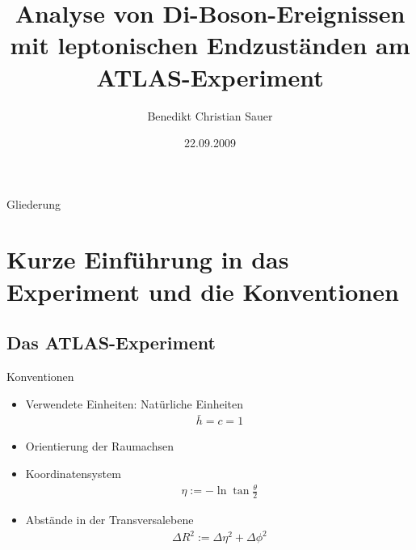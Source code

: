 \documentclass{beamer}
\title[Analyse von Di-Boson-Ereignissen]{Analyse von Di-Boson-Ereignissen mit
leptonischen Endzuständen am ATLAS-Experiment
}
\author[B. Sauer]{Benedikt Christian Sauer}
\institute{Bachelorarbeit am Physikalischen Institut der Universität Bonn}
\date{22.09.2009}
\begin{document}
\begin{frame}
  \titlepage
\end{frame}

\begin{frame}{Gliederung}
  \tableofcontents[pausesections]
\end{frame}

\section{Kurze Einführung in das Experiment und die Konventionen}
\subsection{Das ATLAS-Experiment}

\begin{frame}{Konventionen}
  \begin{itemize}
    \item Verwendete Einheiten: Natürliche Einheiten
      \begin{align}
        \bar h = c = 1
      \end{align}
    \item Orientierung der Raumachsen
      \pause
    \item Koordinatensystem
      \pause
      \begin{align}
        \eta := -\ln{\tan{\frac \theta 2}}
      \end{align}
      \pause
    \item Abstände in der Transversalebene
      \begin{align}
        \Delta R^2 := \Delta\eta^2 + \Delta\phi^2
      \end{align}
  \end{itemize}
\end{frame}
\end{document}
